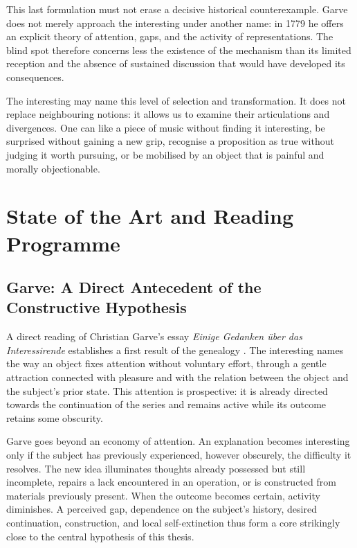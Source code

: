 \documentclass[11pt,a4paper]{article}
\begin{document}
This last formulation must not erase a decisive historical counterexample.
Garve does not merely approach the interesting under another name: in 1779 he
offers an explicit theory of attention, gaps, and the activity of
representations. The blind spot therefore concerns less the existence of the
mechanism than its limited reception and the absence of sustained discussion
that would have developed its consequences.

The interesting may name this level of selection and transformation. It does
not replace neighbouring notions: it allows us to examine their articulations
and divergences. One can like a piece of music without finding it interesting,
be surprised without gaining a new grip, recognise a proposition as true
without judging it worth pursuing, or be mobilised by an object that is painful
and morally objectionable.

\section{State of the Art and Reading Programme}

\subsection{Garve: A Direct Antecedent of the Constructive Hypothesis}

A direct reading of Christian Garve's essay \emph{Einige Gedanken über das
Interessirende} establishes a first result of the genealogy
\parencite[253--274, 313--317]{garve1779interessirende}. The interesting names
the way an object fixes attention without voluntary effort, through a gentle
attraction connected with pleasure and with the relation between the object and
the subject's prior state. This attention is prospective: it is already
directed towards the continuation of the series and remains active while its
outcome retains some obscurity.

Garve goes beyond an economy of attention. An explanation becomes interesting
only if the subject has previously experienced, however obscurely, the
difficulty it resolves. The new idea illuminates thoughts already possessed but
still incomplete, repairs a lack encountered in an operation, or is constructed
from materials previously present. When the outcome becomes certain, activity
diminishes. A perceived gap, dependence on the subject's history, desired
continuation, construction, and local self-extinction thus form a core strikingly
close to the central hypothesis of this thesis.
\end{document}
